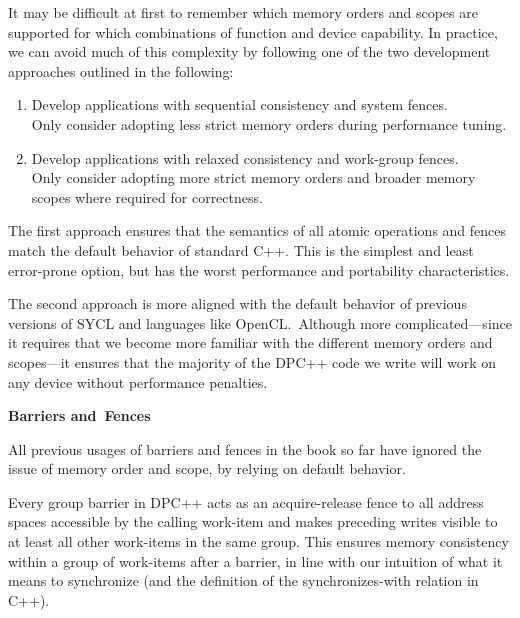 It may be difficult at first to remember which memory orders and scopes are supported for which combinations of function and device capability. In practice, we can avoid much of this complexity by following one of the two development approaches outlined in the following:\par

\begin{enumerate}
	\item Develop applications with sequential consistency and system fences.\\
	Only consider adopting less strict memory orders during performance tuning.
	\item Develop applications with relaxed consistency and work-group fences. \\
	Only consider adopting more strict memory orders and broader memory scopes where required for correctness.
\end{enumerate}

The first approach ensures that the semantics of all atomic operations and fences match the default behavior of standard C++. This is the simplest and least error-prone option, but has the worst performance and portability characteristics.\par

The second approach is more aligned with the default behavior of previous versions of SYCL and languages like OpenCL. Although more complicated—since it requires that we become more familiar with the different memory orders and scopes—it ensures that the majority of the DPC++ code we write will work on any device without performance penalties.\par

\hspace*{\fill} \par %
\textbf{Barriers and Fences}

All previous usages of barriers and fences in the book so far have ignored the issue of memory order and scope, by relying on default behavior.\par

Every group barrier in DPC++ acts as an acquire-release fence to all address spaces accessible by the calling work-item and makes preceding writes visible to at least all other work-items in the same group. This ensures memory consistency within a group of work-items after a barrier, in line with our intuition of what it means to synchronize (and the definition of the synchronizes-with relation in C++).\par

